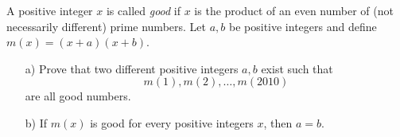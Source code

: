 A positive integer $x$ is called \emph{good} if $x$ is the product of an even number of
(not necessarily different) prime numbers. Let $a,b$ be positive integers and define $m(x)=(x+a)(x+b)$.
\begin{enumerate}
    \item[a)] Prove that two different positive integers $a,b$ exist such that 
	$$m(1),m(2), \ldots, m(2010)$$
	are all good numbers.
    \item[b)] If $m(x)$ is good for every positive integers $x$, then $a=b$.
\end{enumerate}
